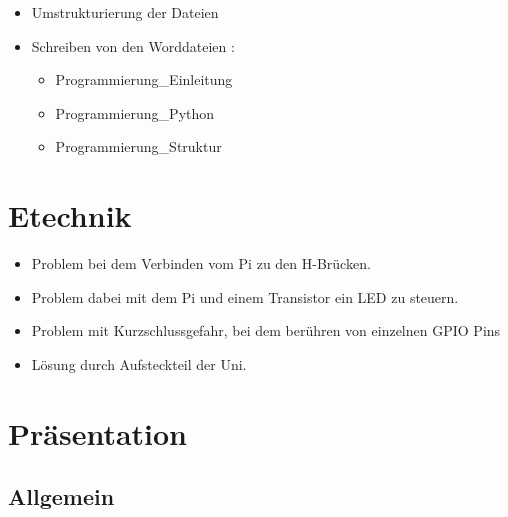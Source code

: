 \documentclass{article}
\begin{document}
\begin{itemize}

\item Umstrukturierung der Dateien

\item Schreiben von den Worddateien :
\begin{itemize}

\item Programmierung\_Einleitung

\item Programmierung\_Python

\item Programmierung\_Struktur

\end{itemize} 

\end{itemize}

\section{Etechnik}

\begin{itemize}

\item Problem bei dem Verbinden vom Pi zu den H-Brücken.

\item Problem dabei mit dem Pi und einem Transistor ein LED zu steuern.


\item Problem mit Kurzschlussgefahr, bei dem berühren von einzelnen GPIO Pins

\item Lösung durch Aufsteckteil der Uni.

\end{itemize}

\section{Präsentation}

\subsection{Allgemein}
\end{document}
